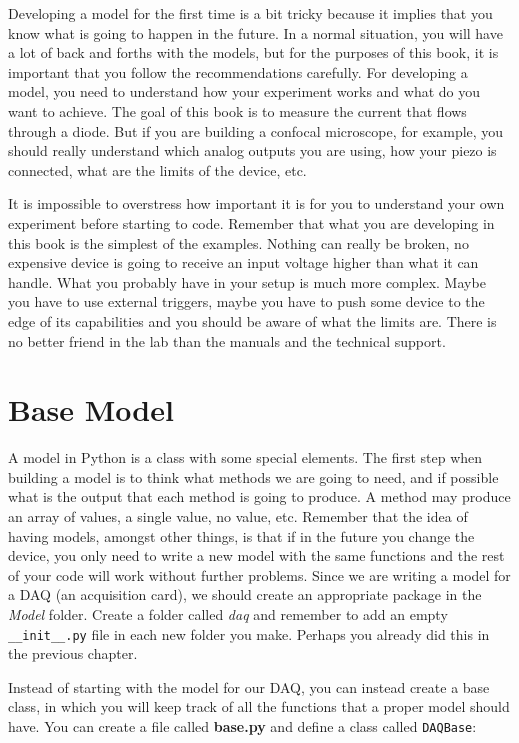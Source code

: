 Developing a model for the first time is a bit tricky because it implies
that you know what is going to happen in the future. In a normal
situation, you will have a lot of back and forths with the models, but
for the purposes of this book, it is important that you follow the
recommendations carefully. For developing a model, you need to
understand how your experiment works and what do you want to achieve.
The goal of this book is to measure the current that flows through a
diode. But if you are building a confocal microscope, for example, you
should really understand which analog outputs you are using, how your
piezo is connected, what are the limits of the device, etc.

It is impossible to overstress how important it is for you to understand
your own experiment before starting to code. Remember that what you are
developing in this book is the simplest of the examples. Nothing can
really be broken, no expensive device is going to receive an input
voltage higher than what it can handle. What you probably have in your
setup is much more complex. Maybe you have to use external triggers,
maybe you have to push some device to the edge of its capabilities and
you should be aware of what the limits are. There is no better friend in
the lab than the manuals and the technical support.

\section{Base Model}\label{basemodel}
A model in Python is a class with some special elements. The first step
when building a model is to think what methods we are going to need, and
if possible what is the output that each method is going to produce. A
method may produce an array of values, a single value, no value, etc.
Remember that the idea of having models, amongst other things, is that
if in the future you change the device, you only need to write a new
model with the same functions and the rest of your code will work
without further problems. Since we are writing a model for a {DAQ} (an
acquisition card), we should create an appropriate package in the
\emph{Model} folder. Create a folder called \emph{daq} and remember to
add an empty \texttt{__init__.py} file in each new folder you make.
Perhaps you already did this in the previous chapter.

Instead of starting with the model for our {DAQ}, you can instead create
a base class, in which you will keep track of all the functions that a
proper model should have. You can create a file called \textbf{base.py}
and define a class called \texttt{DAQBase}:

